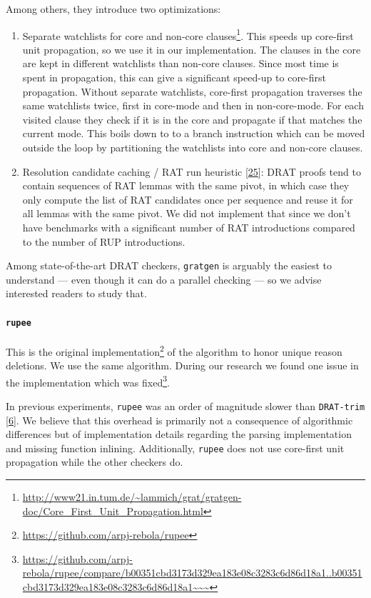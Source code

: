\documentclass[
]{report}
\begin{document}
Among others, they introduce two optimizations:

\begin{enumerate}
\def\labelenumi{\arabic{enumi}.}
\item
  Separate watchlists for core and non-core clauses\footnote{\url{http://www21.in.tum.de/~lammich/grat/gratgen-doc/Core_First_Unit_Propagation.html}}.
  This speeds up core-first unit propagation, so we use it in our
  implementation. The clauses in the core are kept in different
  watchlists than non-core clauses. Since most time is spent in
  propagation, this can give a significant speed-up to core-first
  propagation. Without separate watchlists, core-first propagation
  traverses the same watchlists twice, first in core-mode and then in
  non-core-mode. For each visited clause they check if it is in the core
  and propagate if that matches the current mode. This boils down to to
  a branch instruction which can be moved outside the loop by
  partitioning the watchlists into core and non-core clauses.
\item
  Resolution candidate caching / RAT run heuristic
  {[}\protect\hyperlink{ref-DBLP:confux2fcadeux2fLammich17}{25}{]}: DRAT
  proofs tend to contain sequences of RAT lemmas with the same pivot, in
  which case they only compute the list of RAT candidates once per
  sequence and reuse it for all lemmas with the same pivot. We did not
  implement that since we don't have benchmarks with a significant
  number of RAT introductions compared to the number of RUP
  introductions.
\end{enumerate}

Among state-of-the-art DRAT checkers, \texttt{gratgen} is arguably the
easiest to understand --- even though it can do a parallel checking ---
so we advise interested readers to study that.

\paragraph{\texttt{rupee}}

This is the original implementation\footnote{\url{https://github.com/arpj-rebola/rupee}}
of the algorithm to honor unique reason deletions. We use the same
algorithm. During our research we found one issue in the implementation
which was fixed\footnote{\url{https://github.com/arpj-rebola/rupee/compare/b00351cbd3173d329ea183e08c3283c6d86d18a1..b00351cbd3173d329ea183e08c3283c6d86d18a1~~~}}.

In previous experiments, \texttt{rupee} was an order of magnitude slower
than \texttt{DRAT-trim}
{[}\protect\hyperlink{ref-DBLP:confux2ffmcadux2fRebola-PardoC18}{6}{]}.
We believe that this overhead is primarily not a consequence of
algorithmic differences but of implementation details regarding the
parsing implementation and missing function inlining. Additionally,
\texttt{rupee} does not use core-first unit propagation while the other
checkers do.
\end{document}
